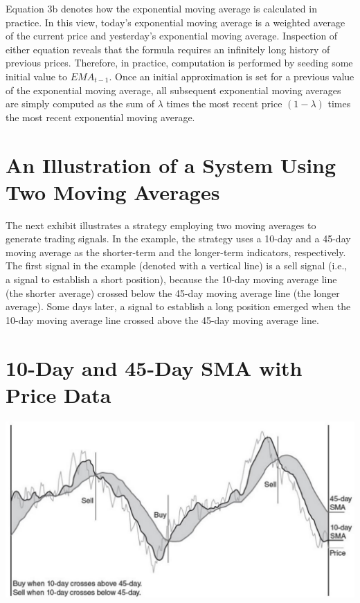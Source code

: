 \documentclass[11pt]{article}
\begin{document}
Equation 3b denotes how the exponential moving average is calculated in practice. In this view, today's exponential moving average is a weighted average of the current price and yesterday's exponential moving average. Inspection of either equation reveals that the formula requires an infinitely long history of previous prices. Therefore, in practice, computation is performed by seeding some initial value to $E M A_{t-1}$. Once an initial approximation is set for a previous value of the exponential moving average, all subsequent exponential moving averages are simply computed as the sum of $\lambda$ times the most recent price $(1-\lambda)$ times the most recent exponential moving average.

\section*{An Illustration of a System Using Two Moving Averages}
The next exhibit illustrates a strategy employing two moving averages to generate trading signals. In the example, the strategy uses a 10-day and a 45-day moving average as the shorter-term and the longer-term indicators, respectively. The first signal in the example (denoted with a vertical line) is a sell signal (i.e., a signal to establish a short position), because the 10-day moving average line (the shorter average) crossed below the 45-day moving average line (the longer average). Some days later, a signal to establish a long position emerged when the 10-day moving average line crossed above the 45-day moving average line.

\section*{10-Day and 45-Day SMA with Price Data}
\begin{center}
\includegraphics[max width=\textwidth]{2024_04_09_5d84553069220c8df1d0g-05}
\end{center}
\end{document}
